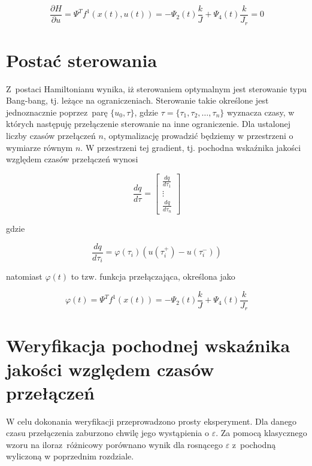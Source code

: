 \documentclass[11pt]{mwart}
\begin{document}
\begin{equation}
	\frac{\partial H}{\partial u} = \Psi^T f^1\left(x\left(t\right),u\left(t\right)\right)=-\Psi_{2}\left(t\right)\frac{k}{J}+\Psi_{4}\left(t\right)\frac{k}{J_{r}}=0
\end{equation}

\section{Postać sterowania}

Z~postaci Hamiltonianu wynika, iż sterowaniem optymalnym jest sterowanie typu Bang-bang, tj. leżące na ograniczeniach. Sterowanie takie określone jest jednoznacznie poprzez~parę $\{u_{0},\tau\}$, gdzie $\tau=\{\tau_{1},\tau_{2},\dots,\tau_{n}\}$ wyznacza czasy, w których następuję przełączenie sterowanie na inne ograniczenie. 
Dla ustalonej liczby czasów przełączeń $n$, optymalizację prowadzić będziemy w przestrzeni o wymiarze równym $n$. W przestrzeni tej gradient, tj. pochodna wskaźnika jakości względem czasów przełączeń wynosi

\begin{equation}
	\frac{dq}{d\tau}=\left[
	\begin{array}{c}
		\frac{dq}{d\tau_{1}} \\
		\vdots \\
		\frac{dq}{d\tau_{n}}
	\end{array}
	\right]
\end{equation}

gdzie

\begin{equation}
	\frac{dq}{d\tau_{i}} = \varphi\left(\tau_{i}\right)\left(u\left(\tau_{i}^{+}\right)-u\left(\tau_{i}^{-}\right)\right)
\end{equation}

natomiast $\varphi\left(t\right)$ to tzw. funkcja przełączająca, określona jako

\begin{equation}
	\varphi\left(t\right)=\Psi^{T}f^{1}\left(x\left(t\right)\right)=-\Psi_{2}\left(t\right)\frac{k}{J}+\Psi_{4}\left(t\right)\frac{k}{J_{r}}
\end{equation}

\section{Weryfikacja pochodnej wskaźnika jakości względem czasów przełączeń}

W celu dokonania weryfikacji przeprowadzono prosty eksperyment. Dla danego czasu przełączenia zaburzono chwilę jego wystąpienia o $\varepsilon$. Za pomocą klasycznego wzoru na iloraz~różnicowy porównano wynik dla rosnącego $\varepsilon$ z~pochodną wyliczoną w poprzednim rozdziale.
\end{document}
